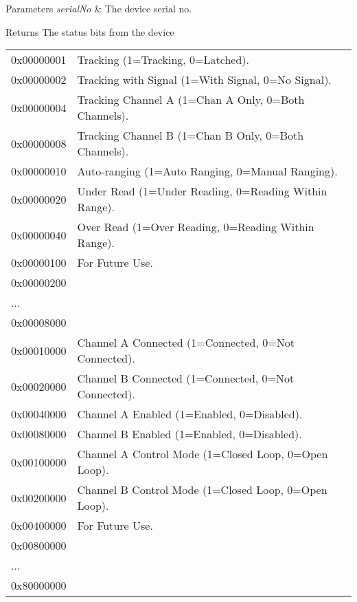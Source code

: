 \begin{DoxyParams}{Parameters}
{\em serial\+No} & The device serial no. \\
\hline
\end{DoxyParams}
\begin{DoxyReturn}{Returns}
The status bits from the device \tabulinesep=1mm
\begin{longtabu} spread 0pt [c]{*2{|X[-1]}|}
\hline
0x00000001&Tracking (1=Tracking, 0=Latched). \\
0x00000002&Tracking with Signal (1=With Signal, 0=No Signal). \\
0x00000004&Tracking Channel A (1=Chan A Only, 0=Both Channels). \\
0x00000008&Tracking Channel B (1=Chan B Only, 0=Both Channels). \\
0x00000010&Auto-\/ranging (1=Auto Ranging, 0=Manual Ranging). \\
0x00000020&Under Read (1=Under Reading, 0=Reading Within Range). \\
0x00000040&Over Read (1=Over Reading, 0=Reading Within Range). \\
0x00000100&For Future Use. \\
0x00000200&\\
...&\\
0x00008000&\\
0x00010000&Channel A Connected (1=Connected, 0=Not Connected). \\
0x00020000&Channel B Connected (1=Connected, 0=Not Connected). \\
0x00040000&Channel A Enabled (1=Enabled, 0=Disabled). \\
0x00080000&Channel B Enabled (1=Enabled, 0=Disabled). \\
0x00100000&Channel A Control Mode (1=Closed Loop, 0=Open Loop). \\
0x00200000&Channel B Control Mode (1=Closed Loop, 0=Open Loop). \\
0x00400000&For Future Use. \\
0x00800000&\\
...&\\
0x80000000&\\
\end{longtabu}

\end{DoxyReturn}
